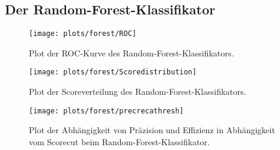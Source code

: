 \subsection{Der Random-Forest-Klassifikator}

\begin{figure}
	\centering
	\texttt{[image: plots/forest/ROC]}
	\caption{Plot der ROC-Kurve des Random-Forest-Klassifikators.}
	\label{fig:RF_ROC}
\end{figure}

\begin{figure}
	\centering
	\texttt{[image: plots/forest/Scoredistribution]}
	\caption{Plot der Scoreverteilung des Random-Forest-Klassifikators.}
	\label{fig:RF_SD}
\end{figure}

\begin{figure}
	\centering
	\texttt{[image: plots/forest/precrecathresh]}
	\caption{Plot der Abhängigkeit von Präzision und Effizienz in Abhängigkeit vom Scorecut beim Random-Forest-Klassifikator.}
	\label{fig:RF_PRT}
\end{figure}

